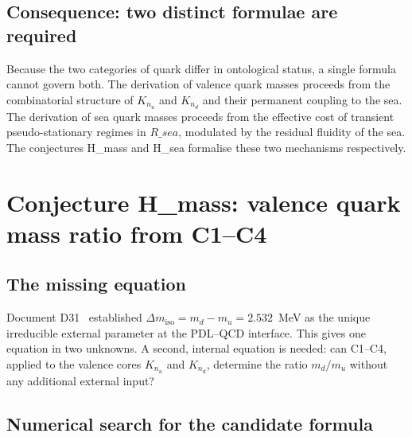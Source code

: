 \documentclass[12pt,a4paper]{article}
\def\PDL{PDL}
\def\Rsea{R\_sea}
\theoremstyle{plain}
\theoremstyle{definition}
\theoremstyle{remark}
\newcommand{\PDL}{\textnormal{PDL}}
\newcommand{\nnu}{n_u}
\newcommand{\nnd}{n_d}
\newcommand{\Rsea}{R_{\mathrm{sea}}}
\newcommand{\Dmiso}{\Delta m_{\mathrm{iso}}}
\newcommand{\mup}{m_u}
\newcommand{\mdown}{m_d}
\begin{document}
\subsection{Consequence: two distinct formulae are required}
\label{subsec:consequence}

Because the two categories of quark differ in ontological status, a single formula cannot govern both. The derivation of valence quark masses proceeds from the combinatorial structure of $K_{\nnu}$ and $K_{\nnd}$ and their permanent coupling to the sea. The derivation of sea quark masses proceeds from the effective cost of transient pseudo-stationary regimes in $\Rsea$, modulated by the residual fluidity of the sea. The conjectures H\_mass and H\_sea formalise these two mechanisms respectively.

\section{\texorpdfstring{Conjecture H\_mass: valence quark mass ratio from C1--C4}{Conjecture H-mass: valence quark mass ratio from C1-C4}}
\label{sec:Hmass}

\subsection{The missing equation}
\label{subsec:missing}

Document D31~\cite{D31} established $\Dmiso = \mdown - \mup = 2.532$~MeV as the unique irreducible external parameter at the \PDL--QCD interface. This gives one equation in two unknowns. A second, internal equation is needed: can C1--C4, applied to the valence cores $K_{\nnu}$ and $K_{\nnd}$, determine the ratio $\mdown/\mup$ without any additional external input?

\subsection{Numerical search for the candidate formula}
\label{subsec:search_mass}
\end{document}
